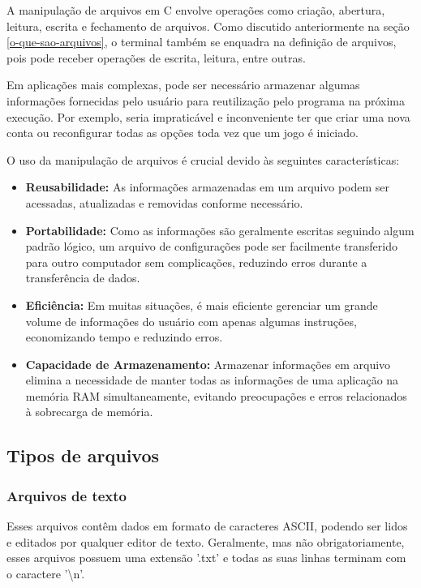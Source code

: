 
A manipulação de arquivos em C envolve operações como criação, abertura, 
leitura, escrita e fechamento de arquivos. Como discutido anteriormente na 
seção \ref{o-que-sao-arquivos}, o terminal também se enquadra na definição de 
arquivos, pois pode receber operações de escrita, leitura, entre outras.

Em aplicações mais complexas, pode ser necessário armazenar algumas informações 
fornecidas pelo usuário para reutilização pelo programa na próxima execução. 
Por exemplo, seria impraticável e inconveniente ter que criar uma nova conta 
ou reconfigurar todas as opções toda vez que um 
jogo é iniciado.

O uso da manipulação de arquivos é crucial devido às seguintes características:

\begin{itemize}
        \renewcommand{\labelitemi}{\tiny$\blacksquare$}
    \item \textbf{Reusabilidade:} As informações armazenadas em um arquivo 
        podem ser acessadas, atualizadas e removidas conforme necessário.
    \item \textbf{Portabilidade:} Como as informações são geralmente escritas 
        seguindo algum padrão lógico, um arquivo de configurações pode ser 
        facilmente transferido para outro computador sem complicações, 
        reduzindo erros durante a transferência de dados.
    \item \textbf{Eficiência:} Em muitas situações, é mais eficiente gerenciar 
        um grande volume de informações do usuário com apenas algumas 
        instruções, economizando tempo e reduzindo erros.
    \item \textbf{Capacidade de Armazenamento:} Armazenar informações em 
        arquivo elimina a necessidade de manter todas as informações de uma 
        aplicação na memória RAM simultaneamente, evitando preocupações e erros 
        relacionados à sobrecarga de memória.
\end{itemize}

\subsection{Tipos de arquivos}

\subsubsection{Arquivos de texto}

Esses arquivos contêm dados em formato de caracteres ASCII, podendo ser lidos e 
editados por qualquer editor de texto. Geralmente, mas não obrigatoriamente, 
esses arquivos possuem uma extensão '.txt' e todas as suas linhas terminam com 
o caractere '\textbackslash n'.

